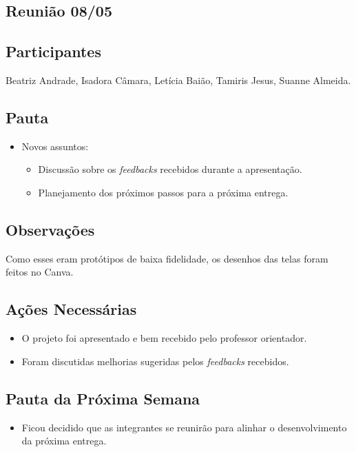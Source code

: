 \begin{apendicesenv}
\section*{Reunião 08/05}

\subsection*{Participantes}
Beatriz Andrade, Isadora Câmara, Letícia Baião, Tamiris Jesus, Suanne Almeida.

\subsection*{Pauta}
\begin{itemize}
    \item Novos assuntos:
    \begin{itemize}
        \item Discussão sobre os \textit{feedbacks} recebidos durante a apresentação.
        \item Planejamento dos próximos passos para a próxima entrega.
    \end{itemize}
\end{itemize}

\subsection*{Observações}
Como esses eram protótipos de baixa fidelidade, os desenhos das telas foram feitos no Canva.

\subsection*{Ações Necessárias}
\begin{itemize}
    \item O projeto foi apresentado e bem recebido pelo professor orientador.
    \item Foram discutidas melhorias sugeridas pelos \textit{feedbacks} recebidos.
\end{itemize}

\subsection*{Pauta da Próxima Semana}
\begin{itemize}
    \item Ficou decidido que as integrantes se reunirão para alinhar o desenvolvimento da próxima entrega.
\end{itemize}


\end{apendicesenv}

